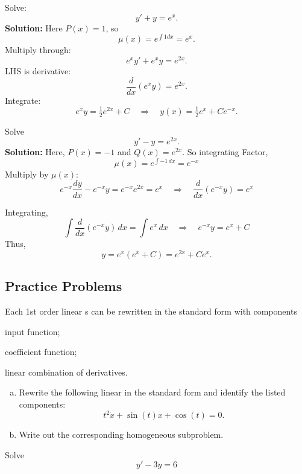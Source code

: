 \begin{example}
Solve:
\[
y' + y = e^x.
\]
\textbf{Solution:}  
Here $P(x)=1$, so
\[
\mu(x) = e^{\int 1 dx} = e^x.
\]
Multiply through:
\[
e^x y' + e^x y = e^{2x}.
\]
LHS is derivative:
\[
\frac{d}{dx}(e^x y) = e^{2x}.
\]
Integrate:
\[
e^x y = \tfrac{1}{2} e^{2x} + C \quad \Rightarrow \quad y(x) = \tfrac{1}{2}e^x + Ce^{-x}.
\]
\end{example}


\begin{example} Solve 
    \[
    y' - y = e^{2x}.
    \]
\textbf{Solution:}
    Here, $P(x) = -1$ and $Q(x) = e^{2x}$.
    So integrating Factor, 
    \[
    \mu(x) = e^{\int -1 \, dx} = e^{-x}
    \]
    Multiply by \(\mu(x)\):
    \[
    e^{-x}\frac{dy}{dx} - e^{-x}y = e^{-x}e^{2x} = e^{x} \quad \Rightarrow \quad \frac{d}{dx}(e^{-x}y) = e^{x}
    \]
    
    Integrating, 
    \[
    \int \frac{d}{dx}(e^{-x}y) \, dx = \int e^{x} \, dx
    \quad \Rightarrow \quad
    e^{-x}y = e^{x} + C
    \]
    Thus, 
    \[
    y = e^{x}(e^{x} + C) = e^{2x} + Ce^{x}.
    \]
\end{example}


\subsection*{Practice Problems}
\begin{question}
  Each 1st order linear \ode{}s can be rewritten in the standard form with components
    \begin{inparaitem}
  \item input function;
  \item coefficient function;
  \item linear combination of derivatives.
  \end{inparaitem}
  \begin{enumerate}[(a)]
  \item Rewrite the following linear \ode{} in the standard
    form and identify the listed components:
  \[
    t^{2} \dot{x} + \sin(t) x + \cos(t) = 0.
  \]
  \solspace{0.5in}
\item Write out the corresponding homogeneous subproblem.
  \solspace{0.5in}
\end{enumerate}
\end{question}

\begin{question}
    Solve
    \[
    y' - 3y = 6
    \]
\end{question}


